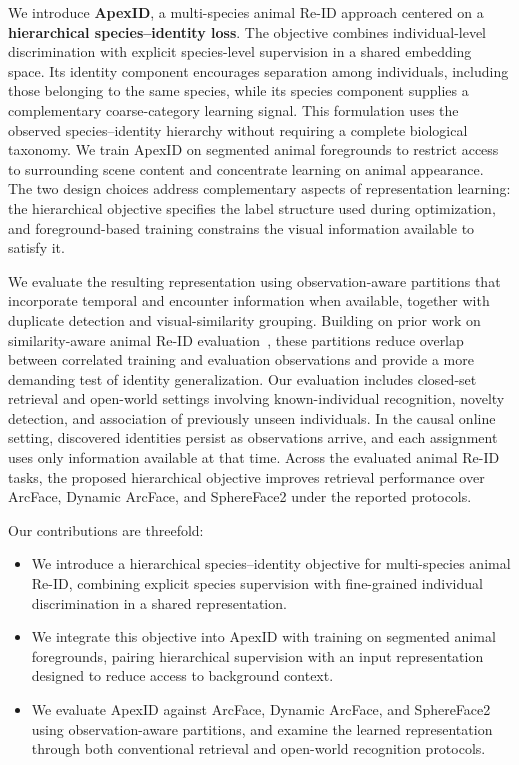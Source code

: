 We introduce \textbf{ApexID}, a multi-species animal Re-ID approach centered on a \textbf{hierarchical species--identity loss}. The objective combines individual-level discrimination with explicit species-level supervision in a shared embedding space. Its identity component encourages separation among individuals, including those belonging to the same species, while its species component supplies a complementary coarse-category learning signal. This formulation uses the observed species--identity hierarchy without requiring a complete biological taxonomy. We train ApexID on segmented animal foregrounds to restrict access to surrounding scene content and concentrate learning on animal appearance. The two design choices address complementary aspects of representation learning: the hierarchical objective specifies the label structure used during optimization, and foreground-based training constrains the visual information available to satisfy it.

We evaluate the resulting representation using observation-aware partitions that incorporate temporal and encounter information when available, together with duplicate detection and visual-similarity grouping. Building on prior work on similarity-aware animal Re-ID evaluation~\cite{Adam_2025_CVPR}, these partitions reduce overlap between correlated training and evaluation observations and provide a more demanding test of identity generalization. Our evaluation includes closed-set retrieval and open-world settings involving known-individual recognition, novelty detection, and association of previously unseen individuals. In the causal online setting, discovered identities persist as observations arrive, and each assignment uses only information available at that time. Across the evaluated animal Re-ID tasks, the proposed hierarchical objective improves retrieval performance over ArcFace, Dynamic ArcFace, and SphereFace2 under the reported protocols.

Our contributions are threefold:
\begin{itemize}
    \item We introduce a hierarchical species--identity objective for multi-species animal Re-ID, combining explicit species supervision with fine-grained individual discrimination in a shared representation.
    \item We integrate this objective into ApexID with training on segmented animal foregrounds, pairing hierarchical supervision with an input representation designed to reduce access to background context.
    \item We evaluate ApexID against ArcFace, Dynamic ArcFace, and SphereFace2 using observation-aware partitions, and examine the learned representation through both conventional retrieval and open-world recognition protocols.
\end{itemize}